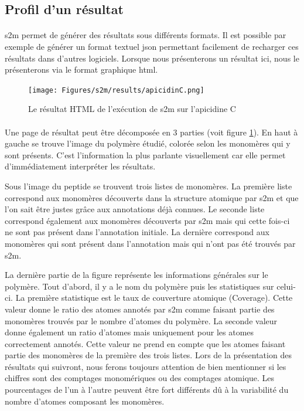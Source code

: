 \documentclass[12pt,french,twoside]{report}
\begin{document}
\subsection{Profil d'un résultat}

\paragraph{}s2m permet de générer des résultats sous différents formats.
Il est possible par exemple de générer un format textuel json permettant facilement de recharger ces résultats dans d'autres logiciels.
Lorsque nous présenterons un résultat ici, nous le présenterons via le format graphique html.

\begin{figure}[!h]
  \begin{center}
    \texttt{[image: Figures/s2m/results/apicidinC.png]}
    \caption{\label{s2m_HTML}Le résultat HTML de l'exécution de s2m sur l'apicidine C}
  \end{center}
\end{figure}

\paragraph{}Une page de résultat peut être décomposée en 3 parties (voit figure \ref{s2m_HTML}).
En haut à gauche se trouve l'image du polymère étudié, colorée selon les monomères qui y sont présents.
C'est l'information la plus parlante visuellement car elle permet d'immédiatement interpréter les résultats.

Sous l'image du peptide se trouvent trois listes de monomères.
La première liste correspond aux monomères découverts dans la structure atomique par s2m et que l'on sait être justes grâce aux annotations déjà connues.
Le seconde liste correspond également aux monomères découverts par s2m mais qui cette fois-ci ne sont pas présent dans l'annotation initiale.
La dernière correspond aux monomères qui sont présent dans l'annotation mais qui n'ont pas été trouvés par s2m.

La dernière partie de la figure représente les informations générales sur le polymère.
Tout d'abord, il y a le nom du polymère puis les statistiques sur celui-ci.
La première statistique est le taux de couverture atomique (Coverage).
Cette valeur donne le ratio des atomes annotés par s2m comme faisant partie des monomères trouvés par le nombre d'atomes du polymère.
La seconde valeur donne également un ratio d'atomes mais uniquement pour les atomes correctement annotés.
Cette valeur ne prend en compte que les atomes faisant partie des monomères de la première des trois listes.
Lors de la présentation des résultats qui suivront, nous ferons toujours attention de bien mentionner si les chiffres sont des comptages monomériques ou des comptages atomique.
Les pourcentages de l'un à l'autre peuvent être fort différents dû à la variabilité du nombre d'atomes composant les monomères.
\end{document}
